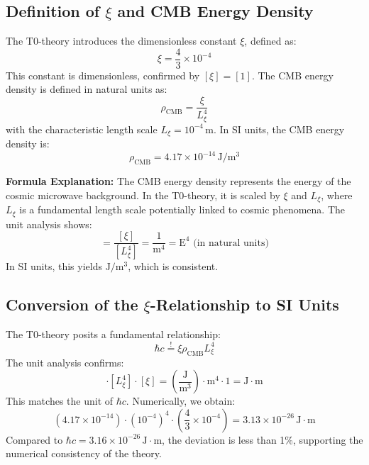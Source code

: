 \documentclass[12pt,a4paper]{article}
\begin{document}
\subsection{Definition of $\xi$ and CMB Energy Density}
The T0-theory introduces the dimensionless constant $\xi$, defined as:
\begin{equation}
	\xi = \frac{4}{3} \times 10^{-4}
\end{equation}
This constant is dimensionless, confirmed by $[\xi] = [1]$. The CMB energy density is defined in natural units as:
\begin{equation}
	\rho_{\text{CMB}} = \frac{\xi}{L_\xi^4}
\end{equation}
with the characteristic length scale $L_\xi = 10^{-4} \, \text{m}$. In SI units, the CMB energy density is:
\begin{equation}
	\rho_{\text{CMB}} = 4.17 \times 10^{-14} \, \text{J}/\text{m}^3
\end{equation}

\textbf{Formula Explanation:} The CMB energy density represents the energy of the cosmic microwave background. In the T0-theory, it is scaled by $\xi$ and $L_\xi$, where $L_\xi$ is a fundamental length scale potentially linked to cosmic phenomena. The unit analysis shows:
\begin{equation}
	[\rho_{\text{CMB}}] = \frac{[\xi]}{[L_\xi^4]} = \frac{1}{\text{m}^4} = \text{E}^4 \text{ (in natural units)}
\end{equation}
In SI units, this yields $\text{J}/\text{m}^3$, which is consistent.

\subsection{Conversion of the $\xi$-Relationship to SI Units}
The T0-theory posits a fundamental relationship:
\begin{equation}
	\hbar c \stackrel{!}{=} \xi \rho_{\text{CMB}} L_\xi^4
\end{equation}
The unit analysis confirms:
\begin{equation}
	[\rho_{\text{CMB}}] \cdot [L_\xi^4] \cdot [\xi] = \left( \frac{\text{J}}{\text{m}^3} \right) \cdot \text{m}^4 \cdot 1 = \text{J} \cdot \text{m}
\end{equation}
This matches the unit of $\hbar c$. Numerically, we obtain:
\begin{equation}
	\left( 4.17 \times 10^{-14} \right) \cdot \left( 10^{-4} \right)^4 \cdot \left( \frac{4}{3} \times 10^{-4} \right) = 3.13 \times 10^{-26} \, \text{J} \cdot \text{m}
\end{equation}
Compared to $\hbar c = 3.16 \times 10^{-26} \, \text{J} \cdot \text{m}$, the deviation is less than 1\%, supporting the numerical consistency of the theory.
\end{document}
